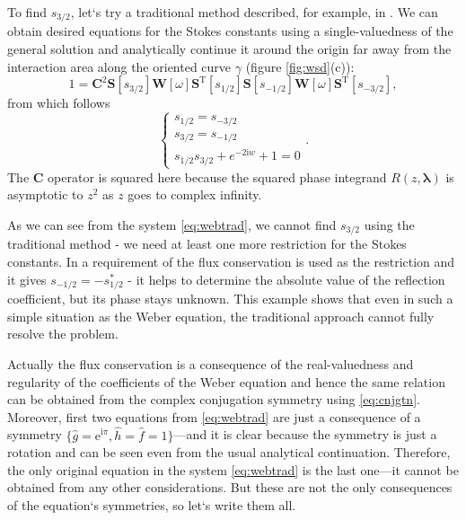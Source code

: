 \documentclass[atmp]{ipart_v1}
\def\rme{\mathrm{e}}
\def\rmi{\mathrm{i}}
\def\lmbd{\bm{\lambda}}
\def\f{\hat{f}}
\def\g{\hat{g}}
\def\h{\hat{h}}
\def\S{\bm{S}}
\def\W{\bm{W}}
\def\C{\bm{C}}
\def\T{\mathrm{T}}
\def\unity{1}
\def\w{\omega}
\newcommand\eref[1]{\eqref{#1}}
\newcommand\fref[1]{figure \ref{#1}}
\begin{document}
To find $s_{3/2}$, let`s try a traditional method described, for example, in \cite{frpaper, rwbook}. 
We can obtain desired equations for the Stokes constants using a single-valuedness of the general 
solution and analytically continue it around the origin far away from the interaction area along the
oriented curve $\gamma$ (\fref{fig:wsd}(c)):
\begin{equation}
\unity = 
\C^2
\S \left[ s_{3/2} \right]
\W \left[ \w \right] 
\S^{\T} \left[ s_{1/2} \right]
\S \left[ s_{-1/2} \right]
\W \left[ \w \right]
\S^{\T} \left[ s_{-3/2} \right],
\end{equation}
from which follows
\begin{equation}
\begin{cases}
s_{1/2} = s_{-3/2}\\
s_{3/2} = s_{-1/2}\\ 
s_{1/2}s_{3/2} + e^{-2 \rmi w} + 1 = 0
\label{eq:webtrad}
\end{cases}.
\end{equation}
The $\C$ operator is squared here because the squared phase integrand $R(z,\lmbd)$ 
is asymptotic to $z^2$ as $z$ goes to complex infinity.

As we can see from the system \eref{eq:webtrad}, we cannot find $s_{3/2}$ using the traditional method - 
we need at least one more restriction for the Stokes constants. In \cite{rwbook} a 
requirement of the flux conservation is used as the restriction 
and it gives $s_{-1/2}=-s_{1/2}^*$ - it helps to determine the absolute value of the
reflection coefficient, but its phase stays unknown. This example shows that even in 
such a simple situation as the Weber equation, the traditional approach cannot fully 
resolve the problem.
 
Actually the flux conservation is a consequence of the real-valuedness and regularity of the coefficients 
of the Weber equation and hence the same relation can be obtained from the 
complex conjugation symmetry using \eref{eq:cnjgtn}. Moreover, first two equations from \eref{eq:webtrad} 
are just a consequence of a symmetry $\{\g=\rme^{\rmi\pi},\h=\f=\unity\}$---and it is clear 
because the symmetry is just a rotation and can be seen even from the usual analytical continuation. 
Therefore, the only original equation in the system \eref{eq:webtrad} is the last one---it cannot 
be obtained from any other considerations. But these are not the only consequences of the 
equation`s symmetries, so let`s write them all.
\end{document}
